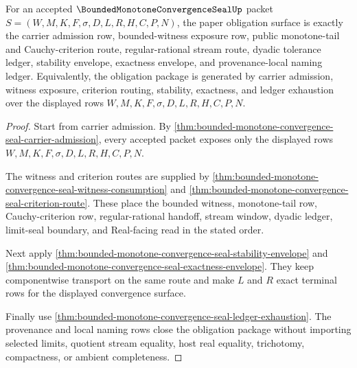 \begin{theorem}
\label{thm:bounded-monotone-convergence-seal-obligation-closure-package}
For an accepted $\BoundedMonotoneConvergenceSealUp$ packet $S=(W,M,K,F,\sigma,D,L,R,H,C,P,N)$, the paper obligation surface is exactly the carrier admission row, bounded-witness exposure row, public monotone-tail and Cauchy-criterion route, regular-rational stream route, dyadic tolerance ledger, stability envelope, exactness envelope, and provenance-local naming ledger. Equivalently, the obligation package is generated by carrier admission, witness exposure, criterion routing, stability, exactness, and ledger exhaustion over the displayed rows $W,M,K,F,\sigma,D,L,R,H,C,P,N$.
\end{theorem}
\begin{proof}
Start from carrier admission. By \autoref{thm:bounded-monotone-convergence-seal-carrier-admission}, every accepted packet exposes only the displayed rows $W,M,K,F,\sigma,D,L,R,H,C,P,N$.

The witness and criterion routes are supplied by \autoref{thm:bounded-monotone-convergence-seal-witness-consumption} and \autoref{thm:bounded-monotone-convergence-seal-criterion-route}. These place the bounded witness, monotone-tail row, Cauchy-criterion row, regular-rational handoff, stream window, dyadic ledger, limit-seal boundary, and Real-facing read in the stated order.

Next apply \autoref{thm:bounded-monotone-convergence-seal-stability-envelope} and \autoref{thm:bounded-monotone-convergence-seal-exactness-envelope}. They keep componentwise transport on the same route and make $L$ and $R$ exact terminal rows for the displayed convergence surface.

Finally use \autoref{thm:bounded-monotone-convergence-seal-ledger-exhaustion}. The provenance and local naming rows close the obligation package without importing selected limits, quotient stream equality, host real equality, trichotomy, compactness, or ambient completeness.
\end{proof}

